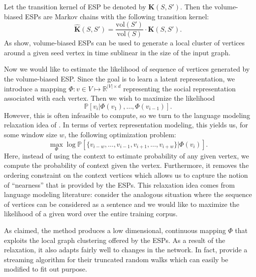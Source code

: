 \documentclass{article}
\begin{document}
Let the transition kernel of ESP be denoted by \(\mathbf{K}(S, S')\).
 Then the volume-biased ESPs are Markov chains with the following transition kernel:
 \[
   \widehat{\mathbf{K}}(S, S')=\frac{\textrm{vol}(S')}{\textrm{vol}(S)}\cdot \mathbf{K}(S, S').
 \]
As \cite{Shayan} show, volume-biased ESPs can be used to generate a local cluster of vertices around a given seed vertex in time sublinear
in the size of the input graph. 

Now we would like to estimate the likelihood of sequence of vertices generated by the volume-biased ESP.
Since the goal is to learn a latent representation, we introduce a mapping \(\Phi: v\in V\mapsto \mathbb{R}^{|V|\times d}\)
representing the social representation associated with each vertex. Then we wish to maximize
the likelihood
\[
  \mathbb{P}\left[v_i|\Phi(v_1),\ldots, \Phi(v_{i-1})\right].
\]
However, this is often infeasible to compute, so we turn to the language modeling relaxation idea of \cite{Perozzi_2014}.
In terms of vertex representation modeling, this yields us, for some window size \(w\), the following optimization problem:
\[
  \max_{\Phi} \log \mathbb{P}[\{v_{i-w},\ldots, v_{i-1}, v_{i+1},\ldots, v_{i+w}\}|\Phi(v_i)].
\]
Here, instead of using the context to estimate probability of any given vertex, we compute the probability of context given
the vertex. Furthermore, it removes the ordering constraint on the context vertices which allows us to capture the notion of ``nearness''
that is provided by the ESPs. This relaxation idea comes from language modeling
literature: consider the analogous situation where the sequence of vertices can be considered as a sentence and we would like to maximize the
likelihood of a given word over the entire training corpus.

As claimed, the method produces a low dimensional, continuous mapping \(\Phi\) that exploits the
local graph clustering offered by the ESPs. As a result of the relaxation, it also adapts fairly well to
changes in the network. In fact, \cite{Perozzi_2014} provide a streaming algorithm for their truncated
random walks which can easily be modified to fit out purpose.
\end{document}
